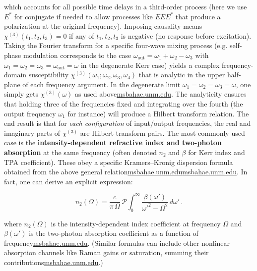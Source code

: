 \documentclass[11pt,a4paper]{article}
\begin{document}
which accounts for all possible time delays in a third-order process (here we use $E^{*}$ for conjugate if needed to allow processes like $E E E^{*}$ that produce a polarization at the original frequency). Imposing causality means $\chi^{(3)}(t_1,t_2,t_3) = 0$ if any of $t_1,t_2,t_3$ is negative (no response before excitation). Taking the Fourier transform for a specific four-wave mixing process (e.g. self-phase modulation corresponds to the case $\omega_{\text{out}}=\omega_1+\omega_2-\omega_3$ with $\omega_1=\omega_2=\omega_3=\omega_{\text{out}}=\omega$ in the degenerate Kerr case) yields a complex frequency-domain susceptibility $\chi^{(3)}(\omega_1;\omega_2,\omega_3,\omega_4)$ that is analytic in the upper half-plane of each frequency argument. In the degenerate limit $\omega_1=\omega_2=\omega_3=\omega$, one simply gets $\chi^{(3)}(\omega)$ as used above\href{https://msbahae.unm.edu/Courses/568%20Nonlinear%20Optics/OSA-Handbook%20of%20Optics-IV-Ch17.pdf#:~:text=ω ω ζ d cn,− ∆ ∆ %3D 0}{msbahae.unm.edu}. The analyticity ensures that holding three of the frequencies fixed and integrating over the fourth (the output frequency $\omega_1$ for instance) will produce a Hilbert transform relation. The end result is that for \emph{each configuration} of input/output frequencies, the real and imaginary parts of $\chi^{(3)}$ are Hilbert-transform pairs. The most commonly used case is the \textbf{intensity-dependent refractive index and two-photon absorption} at the same frequency (often denoted $n_2$ and $\beta$ for Kerr index and TPA coefficient). These obey a specific Kramers–Kronig dispersion formula obtained from the above general relation\href{https://msbahae.unm.edu/Courses/568%20Nonlinear%20Optics/OSA-Handbook%20of%20Optics-IV-Ch17.pdf#:~:text=ω ω ζ d cn,− ∆ ∆ %3D 0}{msbahae.unm.edu}\href{https://msbahae.unm.edu/Courses/568%20Nonlinear%20Optics/OSA-Handbook%20of%20Optics-IV-Ch17.pdf#:~:text=where ζ denotes the perturbation,constant as ωí is varied}{msbahae.unm.edu}. In fact, one can derive an explicit expression:

$$
n_2(\Omega) = \frac{c}{\pi \, \Omega} \, \mathcal{P}\!\int_0^{\infty} \frac{\beta(\omega')}{\omega'^2 - \Omega^2}\, d\omega'\,.
$$

where $n_2(\Omega)$ is the intensity-dependent index coefficient at frequency $\Omega$ and $\beta(\omega')$ is the two-photon absorption coefficient as a function of frequency\href{https://msbahae.unm.edu/Courses/568%20Nonlinear%20Optics/OSA-Handbook%20of%20Optics-IV-Ch17.pdf#:~:text=∫ ∞ − ∆ ∆,ω ω α ω ζ}{msbahae.unm.edu}. (Similar formulas can include other nonlinear absorption channels like Raman gains or saturation, summing their contributions\href{https://msbahae.unm.edu/Courses/568%20Nonlinear%20Optics/OSA-Handbook%20of%20Optics-IV-Ch17.pdf#:~:text=where ζ denotes the perturbation,constant as ωí is varied}{msbahae.unm.edu}.)
\end{document}
